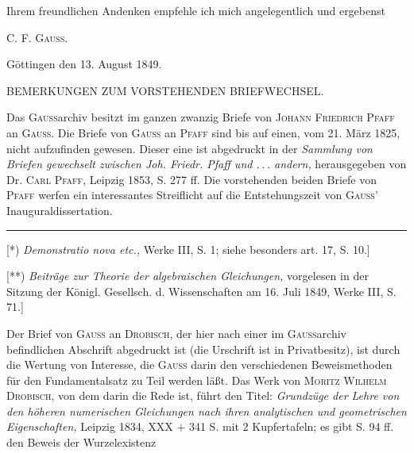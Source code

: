 Ihrem freundlichen Andenken empfehle ich mich angelegentlich und ergebenst
\par\medskip\noindent\hfill C. F. \textsc{Gauss}.\par
\noindent\hspace*{\parindent}Göttingen den 13. August 1849.
\par\bigskip
\begin{center}\small BEMERKUNGEN ZUM VORSTEHENDEN BRIEFWECHSEL.\end{center}
\begingroup\small
\noindent\hspace*{\parindent}Das \textsc{Gauss}archiv besitzt im ganzen zwanzig Briefe von
\textsc{Johann Friedrich Pfaff} an \textsc{Gauss}. Die Briefe von \textsc{Gauss} an
\textsc{Pfaff} sind bis auf einen, vom 21. März 1825, nicht aufzufinden gewesen.
Dieser eine ist abgedruckt in der \textit{Sammlung von Briefen gewechselt zwischen
Joh. Friedr. Pfaff und .\,.\,. andern,} herausgegeben von Dr. \textsc{Carl Pfaff}, Leipzig 1853,
S. 277 ff. Die vorstehenden beiden Briefe von \textsc{Pfaff} werfen ein interessantes Streiflicht
auf die Entstehungszeit von \textsc{Gauss}’ Inauguraldissertation.
\par\smallskip\noindent\rule{.25\linewidth}{.4pt}\par\smallskip
\noindent\hspace*{\parindent}[*) \textit{Demonstratio nova etc.,} Werke III, S. 1; siehe besonders
art. 17, S. 10.]\par
\noindent\hspace*{\parindent}[**) \textit{Beiträge zur Theorie der algebraischen Gleichungen,}
vorgelesen in der Sitzung der Königl. Gesellsch. d. Wissenschaften am 16. Juli 1849,
Werke III, S. 71.]\par
\endgroup
\clearpage
{}
\begingroup\small
\noindent\hspace*{\parindent}Der Brief von \textsc{Gauss} an \textsc{Drobisch}, der hier nach einer
im \textsc{Gauss}archiv befindlichen Abschrift abgedruckt ist (die Urschrift ist in Privatbesitz),
ist durch die Wertung von Interesse, die \textsc{Gauss} darin den verschiedenen Beweismethoden
für den Fundamentalsatz zu Teil werden läßt. Das Werk von \textsc{Moritz Wilhelm Drobisch},
von dem darin die Rede ist, führt den Titel: \textit{Grundzüge der Lehre von den höheren
numerischen Gleichungen nach ihren analytischen und geometrischen Eigenschaften,}
Leipzig 1834, XXX $+$ 341 S. mit 2 Kupfertafeln; es gibt S. 94 ff. den Beweis der Wurzelexistenz
